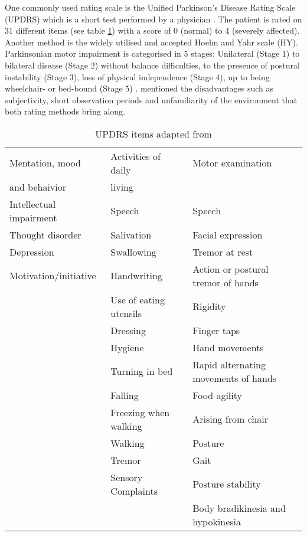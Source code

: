 One commonly used rating scale is the Unified Parkinson’s Disease Rating Scale (UPDRS) which is a short test performed by a physician \cite{klerk_long-term_2009}. The patient is rated on 31 different items (see table \ref{tab:UPDRS}) with a score of 0 (normal) to 4 (severely affected). Another method is the widely utilised and accepted Hoehn and Yahr scale (HY). Parkinsonian motor impairment is categorised in 5 stages: Unilateral (Stage 1) to bilateral disease (Stage 2) without balance difficulties, to the presence of postural instability (Stage 3), loss of physical independence (Stage 4), up to being wheelchair- or bed-bound (Stage 5) \cite{goetz_movement_2004}. \citeauthor{klerk_long-term_2009} \cite{klerk_long-term_2009} mentioned the disadvantages such as subjectivity, short observation periods and unfamiliarity of the environment that both rating methods bring along.

\begin{table}[h]
\begin{tabular}{|l|l|l|}
\hline
Mentation, mood & Activities of daily & Motor examination \\
and behaivior & living & \\
\hline
\hline
Intellectual impairment & Speech & Speech \\

Thought disorder & Salivation & Facial expression\\

Depression & Swallowing & Tremor at rest \\

Motivation/initiative & Handwriting & Action or postural tremor of hands \\

& Use of eating utensils & Rigidity \\

& Dressing & Finger taps\\

& Hygiene & Hand movements\\

& Turning in bed & Rapid alternating movements of hands\\

& Falling & Food agility\\

& Freezing when walking & Arising from chair \\

& Walking & Posture\\

& Tremor & Gait\\

& Sensory Complaints & Posture stability\\

& & Body bradikinesia and hypokinesia \\
\hline
\end{tabular}
\label{tab:UPDRS}
\caption{UPDRS items adapted from \cite{herndon_handbook_2006}}
\end{table}

